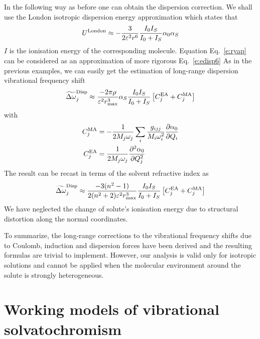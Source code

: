 \documentclass[a4paper,titlepage,twoside,fleqn,12pt]{book}
\newcommand{\fderiv}[2]{\ensuremath{
\frac{\partial #1}{\partial #2}}}
\newcommand{\sderiv}[2]{\ensuremath{
\frac{\partial^2 #1}{\partial #2^2}
}}
\begin{document}
\begin{refsection}
In the following way as before one can obtain the
dispersion correction. We shall use the London isotropic
dispersion energy approximation which states that\citep{London.TransFaradSoc.1937}
%
\begin{equation} \label{e:ryap}
 U^{\rm London} \approx -\frac{3}{2\varepsilon^2 r^6} \frac{I_0I_S}{I_0+I_S} \alpha_0 \alpha_S
\end{equation}
%
$I$ is the ionisation energy of the corresponding
molecule. Equation Eq.~\eqref{e:ryap}
can be considered as an approximation of more rigorous Eq.~\eqref{e:edisp6}
As in the previous examples, we can easily get the estimation of
long\hyp{}range dispersion vibrational frequency shift
%
\begin{equation} \label{e:x123413}
 \widetilde{\Delta \omega}_j^{\rm Disp} \approx
\frac{-2\pi\rho}{\varepsilon^2 r_{\max}^3} \alpha_S \frac{I_0I_S}{I_0+I_S} \left[ C_j^{\rm EA} + C_j^{\rm MA} \right]
\end{equation}
%
with
%
\begin{subequations}
\begin{align}
  C_j^{\rm MA} &= -\frac{1}{2M_j\omega_j}\sum_i \frac{g_{ijj}}{M_i\omega_i^2} \fderiv{\alpha_0}{Q_i}\\
  C_j^{\rm EA} &= \frac{1}{2M_j\omega_j} \sderiv{\alpha_0}{Q_j}
\end{align}
\end{subequations}
%
The result
can be recast in terms of the solvent refractive index
as
%
\begin{equation} \label{e:x1234161}
 \widetilde{\Delta \omega}_j^{\rm Disp} \approx
\frac{-3(n^2-1)}{2(n^2+2)\varepsilon^2 r_{\max}^3} \frac{I_0I_S}{I_0+I_S} \left[ C_j^{\rm EA} + C_j^{\rm MA} \right]
\end{equation}
%
We have neglected the change of solute's ionisation energy due to structural
distortion along the normal coordinates. 

To summarize, the long\hyp{}range corrections to the vibrational
frequency shifts due to Coulomb, induction and dispersion forces
have been derived and the resulting formulas are trivial to implement.
However, our analysis is valid only for isotropic solutions and cannot be 
applied when the molecular environment around the solute is strongly heterogeneous.

\section{Working models of vibrational solvatochromism}


\end{refsection}
\end{document}
